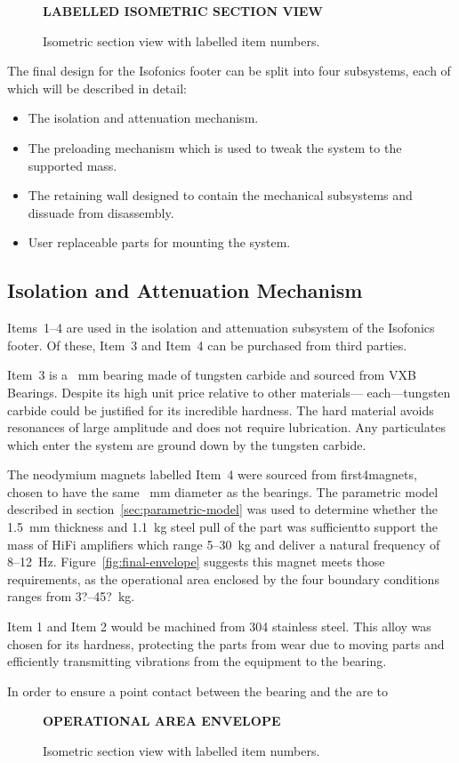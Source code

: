 \documentclass[11pt]{article}
\begin{document}
\begin{figure}[h]
    \centering
    \textbf{LABELLED ISOMETRIC SECTION VIEW}
    \caption{Isometric section view with labelled item numbers.}
    \label{fig:labelled-iso-section}
\end{figure}

The final design for the Isofonics footer can be split into four subsystems, 
each of which will be described in detail:

\begin{itemize}
    \item The isolation and attenuation mechanism.
    \item The preloading mechanism which is used to tweak the system to the 
    supported mass. 
    \item The retaining wall designed to contain the mechanical subsystems and 
    dissuade from disassembly.
    \item User replaceable parts for mounting the system.
\end{itemize}

\subsection{Isolation and Attenuation Mechanism}

Items~1--4 are used in the isolation and attenuation subsystem of the Isofonics 
footer. Of these, Item~3 and Item~4 can be purchased from third parties.

Item~3 is a ~mm bearing made of tungsten carbide and sourced from 
VXB Bearings. Despite its high unit price relative to other 
materials--- each---tungsten carbide could be justified for its 
incredible hardness. The hard material avoids resonances of large amplitude and 
does not require lubrication. Any particulates which enter the system are 
ground down by the tungsten carbide.

The neodymium magnets labelled Item~4 were sourced from first4magnets, 
chosen to have the same ~mm diameter as the bearings. The 
parametric model described in section~\vref{sec:parametric-model} was used to 
determine whether the 1.5~mm thickness and 1.1~kg steel pull of the part was 
sufficientto support the mass of HiFi amplifiers which range 5--30~kg and 
deliver a natural frequency of 8--12~Hz. Figure~\vref{fig:final-envelope} 
suggests this magnet meets those requirements, as the operational area enclosed 
by the four boundary conditions ranges from 3?--45?~kg.

Item 1 and Item 2 would be machined from 304 stainless steel. This alloy was 
chosen for its hardness, protecting the parts from wear due to moving parts and 
efficiently transmitting vibrations from the equipment to the bearing. 

In order to ensure a point contact between the bearing and the 
are to 

\begin{figure}[h]
    \centering
    \textbf{OPERATIONAL AREA ENVELOPE}
    \caption{Isometric section view with labelled item numbers.}
    \label{fig:final-envelope}
\end{figure}

\printbibliography
    
\end{document}
